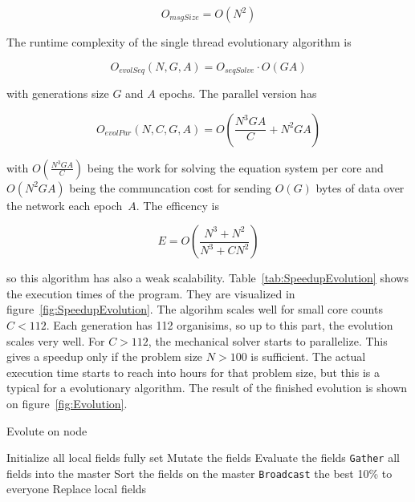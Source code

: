 \documentclass[12pt]{article}
\begin{document}
\begin{equation}
    O_{msgSize} = O(N^2)
\end{equation}

The runtime complexity of the single thread evolutionary algorithm is

\begin{equation}
    O_\mathit{evolSeq}(N, G, A) = O_\textit{seqSolve} \cdot O(G A)
\end{equation}

with generations size $G$ and $A$ epochs. The parallel version has

\begin{equation}
    O_\mathit{evolPar}(N, C, G, A) = O \left( \frac{N^3 G A}{C} + N^2 G A\right)
\end{equation}

with $O (\frac{N^3 G A}{C} )$ being the work for solving the equation system per core and $O(N^2 G A)$ being the communcation cost for sending $O(G)$ bytes of data over the network each epoch~$A$. The efficency is

\begin{equation}
    E = O \left(\frac{N^3 + N^2}{N^3+C N^2}\right)
\end{equation}

so this algorithm has also a weak scalability. Table~\ref{tab:SpeedupEvolution} shows the execution times of the program. They are visualized in figure~\ref{fig:SpeedupEvolution}. The algorihm scales well for small core counts $C < 112$. Each generation has 112 organisims, so up to this part, the evolution scales very well. For $C > 112$, the mechanical solver starts to parallelize. This gives a speedup only if the problem size $N > 100$ is sufficient. The actual execution time starts to reach into hours for that problem size, but this is a typical for a evolutionary algorithm. The result of the finished evolution is shown on figure~\ref{fig:Evolution}.


\begin{algorithm}[p]
    \caption{Evolute on node}
    \begin{algorithmic}
        \STATE Initialize all local fields fully set
            \STATE Mutate the fields
            \STATE Evaluate the fields
            \STATE \texttt{Gather} all fields into the master
            \STATE Sort the fields on the master
            \STATE \texttt{Broadcast} the best 10\% to everyone
            \STATE Replace local fields
        \ENDFOR
    \end{algorithmic}
    \label{alg:Evolution}
\end{algorithm}
\end{document}
